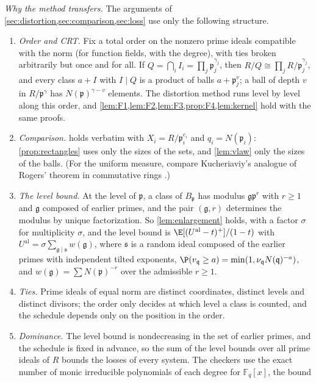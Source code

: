 \emph{Why the method transfers.} The arguments of \cref{sec:distortion,sec:comparison,sec:loss} use only the
following structure.
\begin{enumerate}[label=(\arabic*)]
\item \emph{Order and CRT.} Fix a total order on the nonzero prime ideals compatible with the norm (for function fields,
  with the degree), with ties broken arbitrarily but once and for all. If $Q=\bigcap_iI_i=\prod_j\mathfrak p_j^{\gamma_j}$,
  then $R/Q\cong\prod_jR/\mathfrak p_j^{\gamma_j}$, and every class $a+I$ with $I\mid Q$ is a product of balls
  $a+\mathfrak p_j^{v}$; a ball of depth $v$ in $R/\mathfrak p^{\gamma}$ has $N(\mathfrak p)^{\gamma-v}$ elements.
  The distortion method runs level by level along this order, and \cref{lem:F1,lem:F2,lem:F3,prop:F4,lem:kernel}
  hold with the same proofs.
\item \emph{Comparison.}  holds verbatim with $X_i=R/\mathfrak p_i^{e_i}$ and $q_i=N(\mathfrak p_i)$:
  \cref{prop:rectangles} uses only the sizes of the sets, and \cref{lem:vlaw} only the sizes of the balls. (For the
  uniform measure, compare Kucheriaviy's analogue of Rogers' theorem in commutative rings \cite{Kucheriaviy2026}.)
\item \emph{The level bound.} At the level of $\mathfrak p$, a class of $B_{\mathfrak p}$ has modulus
  $\mathfrak g\mathfrak p^r$ with $r\ge1$ and $\mathfrak g$ composed of earlier primes, and the pair $(\mathfrak g,r)$
  determines the modulus by unique factorization. So \cref{lem:enlargement} holds, with a factor $\sigma$ for
  multiplicity $\sigma$, and the level bound is $\E[(U^{\mathrm{al}}-t)^+]/(1-t)$ with
  $U^{\mathrm{al}}=\sigma\sum_{\mathfrak g\mid\mathfrak s}w(\mathfrak g)$, where $\mathfrak s$ is a random ideal
  composed of the earlier primes with independent tilted exponents, $\P(v_{\mathfrak q}\ge a)=\min(1,\nu_{\mathfrak q}
  N(\mathfrak q)^{-a})$, and $w(\mathfrak g)=\sum N(\mathfrak p)^{-r}$ over the admissible $r\ge1$.
\item \emph{Ties.} Prime ideals of equal norm are distinct coordinates, distinct levels and distinct divisors; the
  order only decides at which level a class is counted, and the schedule depends only on the position in the order.
\item \emph{Dominance.} The level bound is nondecreasing in the set of earlier primes, and the schedule is fixed in
  advance, so the sum of the level bounds over all prime ideals of $R$ bounds the losses of every system. The
  checkers use the exact number of monic irreducible polynomials of each degree for $\mathbb{F}_q[x]$, the bound

\end{enumerate}
